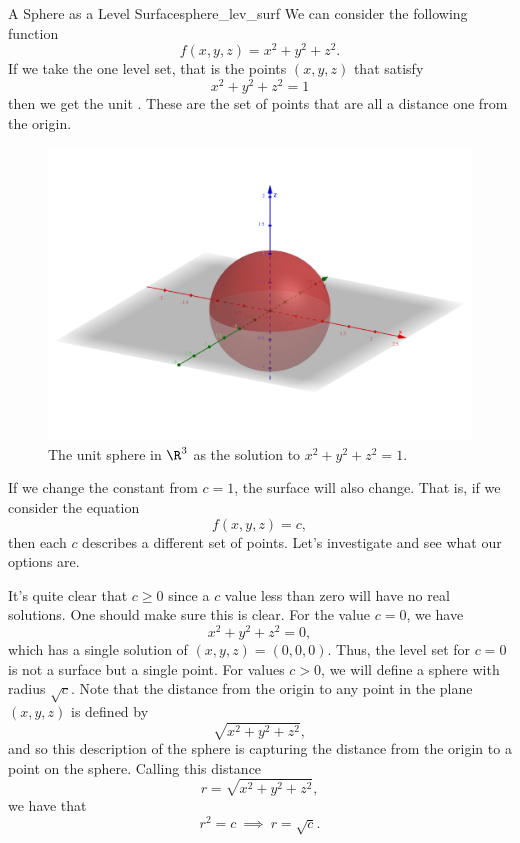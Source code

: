                 \begin{ex}{A Sphere as a Level Surface}{sphere_lev_surf}
                We can consider the following function
                \[
                f(x,y,z)=x^2+y^2+z^2.
                \]
                If we take the one level set, that is the points $(x,y,z)$ that satisfy
                \[
                x^2+y^2+z^2=1
                \]
                then we get the unit .  These are the set of points that are all a distance one from the origin.  
              	\begin{figure}[H]
              		\centering
              		\includegraphics[width=.8\textwidth]{Figures_Part_6/Sphere.png}
              		\caption{The unit sphere in $\R^3$ as the solution to $x^2+y^2+z^2=1$.}
              	\end{figure}
              	
              	If we change the constant from $c=1$, the surface will also change.  That is, if we consider the equation
              	\[
              	f(x,y,z)=c,
              	\]
              	then each $c$ describes a different set of points.  Let's investigate and see what our options are.
              	
              	It's quite clear that $c\geq 0$ since a $c$ value less than zero will have no real solutions.  One should make sure this is clear.  For the value $c=0$, we have
              	\[
              	x^2+y^2+z^2=0,
              	\]
              	which has a single solution of $(x,y,z)=(0,0,0)$.  Thus, the level set for $c=0$ is not a surface but a single point.  For values $c>0$, we will define a sphere with radius $\sqrt{c}$.  Note that the distance from the origin to any point in the plane $(x,y,z)$ is defined by
              	\[
              	\sqrt{x^2+y^2+z^2},
              	\]
              	and so this description of the sphere is capturing the distance from the origin to a point on the sphere.  Calling this distance 
              	\[
              	r=\sqrt{x^2+y^2+z^2},
              	\]
              	we have that
              	\[
              	r^2 = c ~ \implies~ r = \sqrt{c}.
              	\]
                \end{ex}
                
